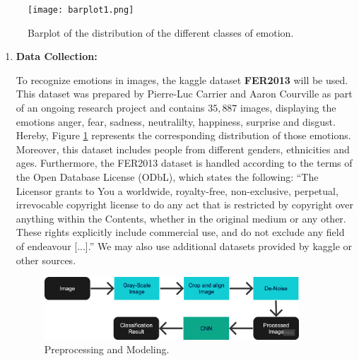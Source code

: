 \begin{figure}[h!]
\centering
\texttt{[image: barplot1.png]}
\caption{Barplot of the distribution of the different classes of emotion.}\label{fig:emo-distribution}
\end{figure}

\begin{enumerate}
\item \textbf{Data Collection:} %

To recognize emotions in images, the kaggle dataset \textbf{FER2013} \cite{FER2013} will be used. This dataset was prepared by Pierre-Luc Carrier and Aaron Courville as part of an ongoing research project and contains $35,887$ images, displaying the emotions anger, fear, sadness, neutralilty, happiness, surprise and disgust. Hereby, Figure \ref{fig:emo-distribution} represents the corresponding distribution of those emotions. Moreover, this dataset includes people from different genders, ethnicities and ages. Furthermore, the FER2013 dataset is handled according to the terms of the Open Database License (ODbL), which states the following: ``The Licensor grants to You a worldwide, royalty-free, non-exclusive, perpetual, irrevocable copyright license to do any act that is restricted by copyright over anything within the Contents, whether in the original medium or any other. These rights explicitly include commercial use, and do not exclude any field of endeavour [...].'' \cite{odbl} We may also use additional datasets provided by kaggle or other sources.

\begin{figure}[h]
\centering
\includegraphics[width=0.9\textwidth]{images/fer-preprocessing-modelling.png}
\caption{Preprocessing and Modeling.}\label{fig:prep-mod}
\end{figure}


\end{enumerate}

